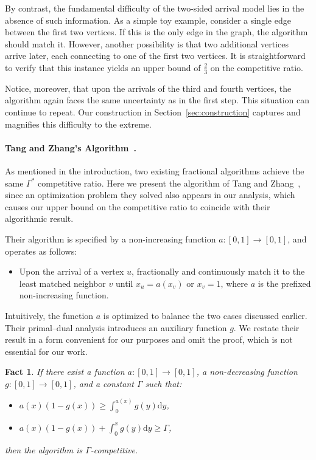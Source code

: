 \documentclass[11pt,letterpaper]{article}
\newtheorem{fact}{Fact}[section]
\newcommand{\dd}[1]{\mathrm{d}#1}
\begin{document}
By contrast, the fundamental difficulty of the two-sided arrival model lies in the absence of such information. As a simple toy example, consider a single edge between the first two vertices. If this is the only edge in the graph, the algorithm should match it. However, another possibility is that two additional vertices arrive later, each connecting to one of the first two vertices. It is straightforward to verify that this instance yields an upper bound of $\tfrac{2}{3}$ on the competitive ratio.

Notice, moreover, that upon the arrivals of the third and fourth vertices, the algorithm again faces the same uncertainty as in the first step. This situation can continue to repeat. Our construction in Section~\ref{sec:construction} captures and magnifies this difficulty to the extreme.

\paragraph{Tang and Zhang's Algorithm~\cite{ec/TangZ24}.}
As mentioned in the introduction, two existing fractional algorithms achieve the same $\Gamma^*$ competitive ratio. Here we present the algorithm of Tang and Zhang~\cite{ec/TangZ24}, since an optimization problem they solved also appears in our analysis, which causes our upper bound on the competitive ratio to coincide with their algorithmic result.

Their algorithm is specified by a non-increasing function $a: [0,1] \to [0,1]$, and operates as follows:
\begin{itemize}
\item Upon the arrival of a vertex $u$, fractionally and continuously match it to the least matched neighbor $v$ until $x_u = a(x_v)$ or $x_v = 1$, where $a$ is the prefixed non-increasing function.
\end{itemize}

Intuitively, the function $a$ is optimized to balance the two cases discussed earlier. Their primal–dual analysis introduces an auxiliary function $g$. We restate their result in a form convenient for our purposes and omit the proof, which is not essential for our work.

\begin{fact}
\label{fact:tz}
If there exist a function $a:[0,1] \to [0,1]$, a non-decreasing function $g:[0,1]\to [0,1]$, and a constant $\Gamma$ such that:
\begin{itemize}
\item $a(x) (1-g(x)) \ge \int_0^{a(x)} g(y) \dd y$,
\item $a(x) (1-g(x)) + \int_0^x g(y) \dd y \ge \Gamma$,
\end{itemize}
then the algorithm is $\Gamma$-competitive.
\end{fact}
\end{document}
